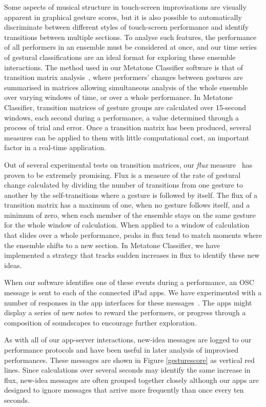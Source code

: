 \documentclass[graybox]{svmult}
\begin{document}
Some aspects of musical structure in touch-screen improvisations are
visually apparent in graphical gesture scores, but it is also possible
to automatically discriminate between different styles of touch-screen
performance and identify transitions between multiple sections. To
analyse such features, the performance of all performers in an
ensemble must be considered at once, and our time series of gestural
classifications are an ideal format for exploring these ensemble
interactions. The method used in our Metatone Classifier software is
that of transition matrix analysis~\cite{Swift:2014tya}, where
performers' changes between gestures are summarised in matrices
allowing simultaneous analysis of the whole ensemble over varying
windows of time, or over a whole performance. In Metatone Classifier,
transition matrices of gesture groups are calculated over 15-second
windows, each second during a performance, a value determined through
a process of trial and error. Once a transition matrix has been
produced, several measures can be applied to them with little
computational cost, an important factor in a real-time application.

Out of several experimental tests on transition matrices, our
\emph{flux} measure~\cite{Martin:2015jk} has proven to be extremely
promising. Flux is a measure of the rate of gestural change calculated
by dividing the number of transitions from one gesture to another by
the self-transitions where a gesture is followed by itself. The flux
of a transition matrix has a maximum of one, when no gesture follows
itself, and a minimum of zero, when each member of the ensemble stays
on the same gesture for the whole window of calculation. When applied
to a window of calculation that slides over a whole performance, peaks
in flux tend to match moments where the ensemble shifts to a new
section. In Metatone Classifier, we have implemented a strategy that
tracks sudden increases in flux to identify these new ideas.

When our software identifies one of these events during a performance,
an OSC message is sent to each of the connected iPad apps. We have
experimented with a number of responses in the app interfaces for
these messages~\cite{Martin:2015jk}. The apps might display a series
of new notes to reward the performers, or progress through a
composition of soundscapes to encourage further exploration.

As with all of our app-server interactions, new-idea messages are
logged to our performance protocols and have been useful in later
analysis of improvised performances. These messages are shown in
Figure \ref{gesturescore} as vertical red lines. Since calculations
over several seconds may identify the same increase in flux, new-idea
messages are often grouped together closely although our apps are
designed to ignore messages that arrive more frequently than once
every ten seconds. 
\end{document}
